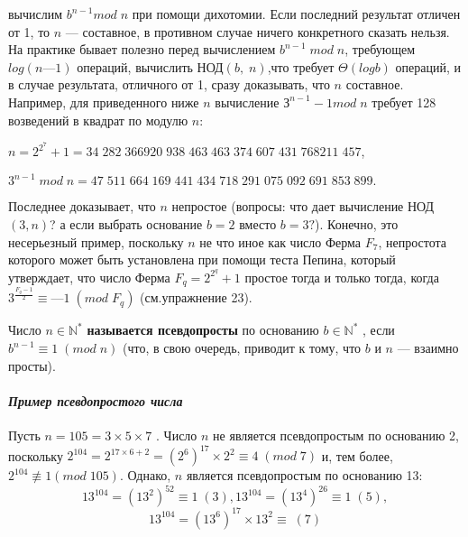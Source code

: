   	
  	\noindent
  	вычислим $b^{n-1} mod\;n$ при помощи дихотомии. Если последний результат отличен от 1, то $n$ — составное, в противном случае ничего конкретного сказать нельзя. На практике бывает полезно перед вычислением $b^{n-1}\;mod\;n$, требующем $log(n— 1)$ операций, вычислить НОД$(b,\;n)$,что требует $\varTheta(logb)$ операций, и в случае результата, отличного от 1,
  	сразу доказывать, что $n$ составное. Например, для приведенного ниже $n$ вычисление $З^{n-1}- 1 mod\;n$ требует 128 возведений в квадрат по модулю $n$:
  	\begin{center}
  		$n=2^{2^{7}}+1=34\; 282 \;366 920\; 938\; 463\; 463\; 374\; 607\; 431\;768 211\;457$,
  		
  		$3^{n-1}\;mod\;n=47\; 511\;664\;169 \;441\;434\; 718\; 291\;075\; 092 \;691\;853 \;899.$
  	\end{center}
  	\noindent
  	Последнее доказывает, что $n$ непростое (вопросы: что дает вычисление НОД$(3,n)$? а если выбрать основание $b = 2$ вместо $b = 3?$). Конечно,  это несерьезный пример, поскольку $n$ не что иное как число Ферма  $F_7$, непростота которого может быть установлена при помощи теста  Пепина, который утверждает, что число Ферма $F_q=2^{2^{q}}+1$ простое  тогда и только тогда, когда $3^{\frac{F_q-1}{2}}\equiv —1\;(mod\;F_q)$ (см.упражнение 23).
  	\begin{determ}
  	\noindent
  	
  	Число $n \in \mathbb N^{*}$ {\bf называется псевдопросты}  по основанию $b \in \mathbb N^{*}$ ,	если $b^{n-1} \equiv 1\;(mod\;n)$ (что, в свою очередь, приводит к тому, что $b$ и $n$ — взаимно просты).
  	\end{determ}
  	\paragraph{{\it Пример псевдопростого числа}}
  	\noindent
  	
  	Пусть $n=105 = 3\times5\times7$ . Число $n$ не является псевдопростым по основанию 2, поскольку $2^104 = 2^{17\times6+2}= (2^6)^{17} \times 2^2 \equiv 4\;(mod\;7)$
  	и, тем более, $2^{104} \not\equiv 1 (mod\;105)$. Однако, $n$ является псевдопростым по основанию 13:
  	\begin{equation}
  	13^{104}=(13^2)^{52}\equiv 1\;(3), 13^104=(13^4)^{26} \equiv 1\;(5),
  	\end{equation}
  	\begin{equation}
  	 13^{104} = (13^6)^{17}\times 13^2 \equiv \;(7)
  	\end{equation}

